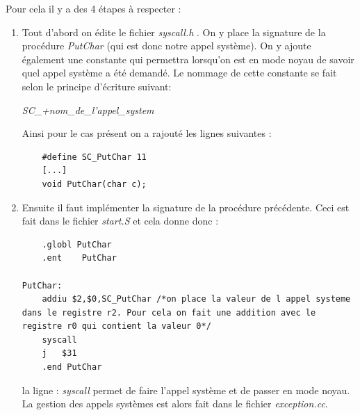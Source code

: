 \documentclass[a4paper,10pt]{report}
\begin{document}
  Pour cela il y a des 4 étapes à respecter :
  \begin{enumerate}
   \item Tout d'abord on édite le fichier \emph{syscall.h} . On y place la signature de la procédure \emph{PutChar} (qui est donc notre appel système). 
   On y ajoute également une constante qui permettra lorsqu'on est en mode noyau de savoir quel appel système a été demandé. Le nommage de cette constante 
   se fait selon le principe d'écriture suivant:
   \begin{center}
    \emph{SC\_+nom\_de\_l'appel\_system}
   \end{center}
  Ainsi pour le cas présent on a rajouté les lignes suivantes : 
  \begin{lstlisting}
    #define SC_PutChar 11
    [...]
    void PutChar(char c);
  \end{lstlisting}
  \item Ensuite il faut implémenter la signature de la procédure précédente. Ceci est fait dans le fichier \emph{start.S} et cela donne donc :
  \begin{lstlisting}
	.globl PutChar
	.ent 	PutChar

PutChar:
	addiu $2,$0,SC_PutChar /*on place la valeur de l appel systeme dans le registre r2. Pour cela on fait une addition avec le registre r0 qui contient la valeur 0*/
	syscall
	j	$31
	.end PutChar   
  \end{lstlisting}
la ligne : \emph{syscall} permet de faire l'appel système et de passer en mode noyau. La gestion des appels systèmes est alors fait dans le fichier 
\emph{exception.cc}. 


\end{enumerate}
\end{document}
